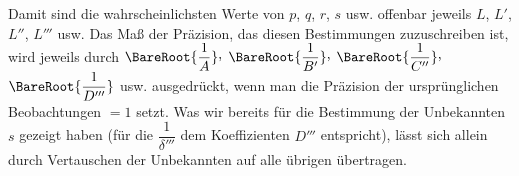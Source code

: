 Damit sind die wahrscheinlichsten Werte von $p$, $q$, $r$, $s$ usw. offenbar jeweils $L$, $L'$, $L''$, $L'''$ usw. Das Maß der Präzision, das diesen Bestimmungen zuzuschreiben ist, wird jeweils durch
$\BareRoot{\dfrac{1}{A}}\mathpunct{\raisebox{.45ex}{,}}$
$\BareRoot{\dfrac{1}{B'}}\mathpunct{\raisebox{.45ex}{,}}$
$\BareRoot{\dfrac{1}{C''}}\mathpunct{\raisebox{.45ex}{,}}$
$\BareRoot{\dfrac{1}{D'''}}$ usw. ausgedrückt, wenn man die Präzision der ursprünglichen Beobachtungen $=1$ setzt. Was wir bereits für die Bestimmung der Unbekannten $s$ gezeigt haben (für die $\dfrac{1}{\delta'''}$ dem Koeffizienten $D'''$ entspricht), lässt sich allein durch Vertauschen der Unbekannten auf alle übrigen übertragen.%
